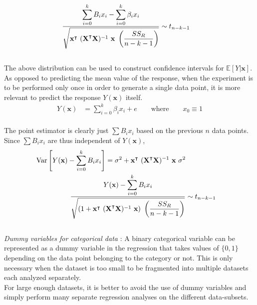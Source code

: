 \begin{align}
	\frac{\displaystyle \sum\limits_{i = 0}^{k} B_i x_i - \sum\limits_{i = 0}^{k} \beta_i x_i}{\displaystyle \sqrt{\textbf{x}^\intercal \ (\textbf{X}^\intercal \textbf{X})^{-1}\ \textbf{x}\ \left(\frac{SS_R}{n-k-1}\right)}} &\sim t_{n-k-1}
\end{align}\\

The above distribution can be used to construct confidence intervals for $ \mathbb{E}[Y|\textbf{x}] $.\\

As opposed to predicting the mean value of the response, when the experiment is to be performed only once in order to generate a single data point, it is more relevant to predict the response $ Y(\textbf{x}) $ itself.\\

\begin{align}
	Y(\textbf{x}) &= \sum\limits_{i = 0}^{k} \beta_i x_i + e \qquad \text{where} \qquad x_0 \equiv 1
\end{align}\\

The point estimator is clearly just $ \sum B_i x_i $ based on the previous $ n $ data points. Since $ \sum B_i x_i $ are thus independent of $ Y(\textbf{x}) $, \\


\begin{align}
	\mathrm{Var}\left[ Y(\textbf{x}) - \sum\limits_{i = 0}^{k} B_i x_i \right] = \sigma^2 + \textbf{x}^\intercal \ (\textbf{X}^\intercal \textbf{X})^{-1}\ \textbf{x}\ \sigma^2 \\
	\frac{\displaystyle Y(\textbf{x}) - \sum\limits_{i = 0}^{k} B_i x_i}{\displaystyle \sqrt{\left(1 + \textbf{x}^\intercal \ (\textbf{X}^\intercal \textbf{X})^{-1}\ \textbf{x}\right)\ \left(\frac{SS_R}{n-k-1}\right)}} &\sim t_{n-k-1}
\end{align}\\

\textit{Dummy variables for categorical data} : A binary categorical variable can be represented as a dummy variable in the regression that takes values of $ \{0, 1\} $ depending on the data point belonging to the category or not. This is only necessary when the dataset is too small to be fragmented into multiple datasets each analyzed separately.\\

For large enough datasets, it is better to avoid the use of dummy variables and simply perform many separate regression analyses on the different data-subsets.\\

